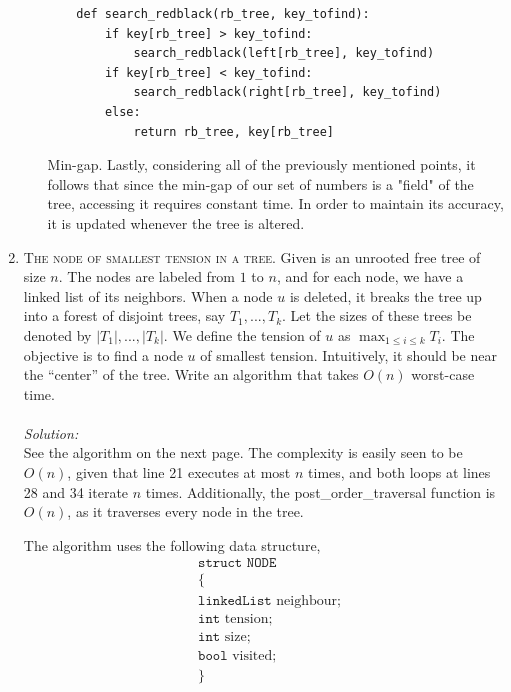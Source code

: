 \documentclass[12pt]{article}
\theoremstyle{definition}
\theoremstyle{remark}
\newcommand\sol{%
  \\ 
  \\
  \textit{Solution:}\\%
}
\begin{document}
\begin{enumerate}
\begin{enumerate}
\begin{lstlisting}
    def search_redblack(rb_tree, key_tofind):
        if key[rb_tree] > key_tofind:
            search_redblack(left[rb_tree], key_tofind)
        if key[rb_tree] < key_tofind:
            search_redblack(right[rb_tree], key_tofind)
        else:
            return rb_tree, key[rb_tree]
\end{lstlisting}
\item[\sc Min-gap.] Lastly, considering all of the previously mentioned points, it follows that since the min-gap of our set of numbers is a "field" of the tree, accessing it requires constant time. In order to maintain its accuracy, it is updated whenever the tree is altered. 
\end{enumerate}
\newpage 
\item \textsc{The node of smallest tension in a tree.} Given is an unrooted free tree of size $n$.
The nodes are labeled from $1$ to $n$, and for each node, we have a linked list of its neighbors. When a node $u$ is deleted, it breaks the tree up into a forest of disjoint trees, say $T_1, ... , T_k$. Let the sizes of these trees be denoted by $|T_1|,... , |T_k|$. We define the tension of $u$ as $\max_{1 \leq i \leq k} T_i$. The objective is to find a node $u$ of smallest tension. Intuitively, it should be near the “center” of the tree. Write an algorithm
that takes $O(n)$ worst-case time.
\sol 
See the algorithm on the next page. The complexity is easily seen to be $O(n)$, given that line 21 executes at most $n$ times, and both loops at lines 28 and 34 iterate $n$ times. Additionally, the post\_order\_traversal function is $O(n)$, as it traverses every node in the tree. 

The algorithm uses the following data structure, 
\begin{equation*}
  \begin{split}
    &\texttt{struct NODE}\\ 
    &\{\\ 
    &\texttt{linkedList } \text{neighbour}; \\ 
    &\texttt{int } \text{tension}; \\ 
    &\texttt{int } \text{size} ;\\ 
    &\texttt{bool }\text{visited}; \\
    &\}\\
  \end{split}
\end{equation*}


\end{enumerate}
\end{document}
